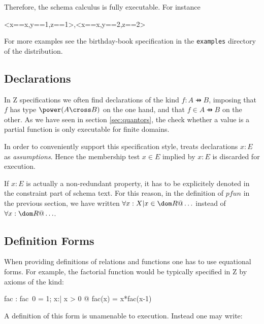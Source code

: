 \documentclass{article}
\begin{document}
Therefore, the schema calculus is fully executable. For instance

\begin{zexecexpr}  \land [y,z:\num | y = z]
\yields
  {<x==x,y==1,z==1>,<x==x,y==2,z==2>}   
\end{zexecexpr}

For more examples see the birthday-book specification in the
\verb:examples: directory of the \Zeta{} distribution.


\subsection{Declarations}
\label{sec:decls}

In Z specifications we often find declarations of the kind $f: A \pfun
B$, imposing that $f$ has type $\power (A \cross B)$ on the one hand,
and that $f \in A \pfun B$ on the other. As we have seen in section
\ref{sec:quantors}, the check whether a value is a partial function is
only executable for finite domains.

In order to conveniently support this specification style, \ZAP{}
treats declarations $x:E$ as \emph{assumptions}. Hence the membership
test $x \in E$ implied by $x:E$ is discarded for execution. 

If $x:E$ is actually a non-redundant property, it has to be
explicitely denoted in the constraint part of schema text.
For this reason, in the definition of $pfun$ in the
previous section, we have written $\forall x: X | x \in \dom R @ \ldots$
instead of $\forall x:\dom R @ \ldots$.



\subsection{Definition Forms}

When providing definitions of relations and functions one has to use
equational forms.  For example, the factorial function would be
typically specified in Z by axioms of the kind:


\begin{axdef}
  fac : \nat \fun \nat
\where
  fac~0 = 1; \forall x:\nat | x > 0 @ fac(x) = x*fac(x-1)
\end{axdef}

A definition of this form is unamenable to execution. Instead one
may write:
\end{document}
